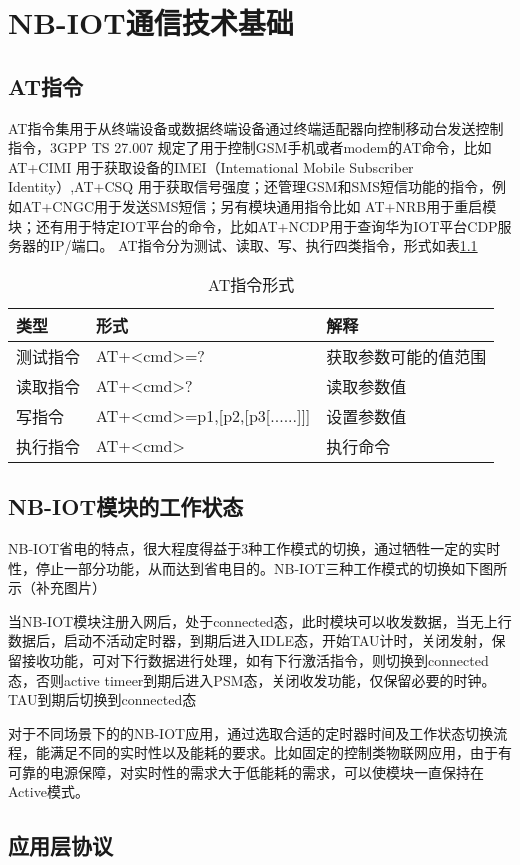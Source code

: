 \chapter{NB-IOT通信技术基础}


\section{AT指令}
AT指令集用于从终端设备或数据终端设备通过终端适配器向控制移动台发送控制指令，3GPP TS 27.007 规定了用于控制GSM手机或者modem的AT命令，比如 AT+CIMI 用于获取设备的IMEI（Intemational Mobile Subscriber Identity）,AT+CSQ 用于获取信号强度；还管理GSM和SMS短信功能的指令，例如AT+CNGC用于发送SMS短信；另有模块通用指令比如 AT+NRB用于重启模块；还有用于特定IOT平台的命令，比如AT+NCDP用于查询华为IOT平台CDP服务器的IP/端口。
AT指令分为测试、读取、写、执行四类指令，形式如表\ref{AT指令形式}

\begin{table}[h!]
\caption{AT指令形式}
\begin{tabular}{lll}
\toprule
类型&形式&解释\\
\midrule
测试指令&AT+<cmd>=?&获取参数可能的值范围\\
读取指令&AT+<cmd>?&读取参数值\\
写指令&AT+<cmd>=p1,[p2,[p3[......]]]&设置参数值\\
执行指令&AT+<cmd>&执行命令\\
\bottomrule
\end{tabular}
\label{AT指令形式}
\end{table}


\section{NB-IOT模块的工作状态}
NB-IOT省电的特点，很大程度得益于3种工作模式的切换，通过牺牲一定的实时性，停止一部分功能，从而达到省电目的。NB-IOT三种工作模式的切换如下图所示（补充图片）

当NB-IOT模块注册入网后，处于connected态，此时模块可以收发数据，当无上行数据后，启动不活动定时器，到期后进入IDLE态，开始TAU计时，关闭发射，保留接收功能，可对下行数据进行处理，如有下行激活指令，则切换到connected态，否则active timeer到期后进入PSM态，关闭收发功能，仅保留必要的时钟。TAU到期后切换到connected态

对于不同场景下的的NB-IOT应用，通过选取合适的定时器时间及工作状态切换流程，能满足不同的实时性以及能耗的要求。比如固定的控制类物联网应用，由于有可靠的电源保障，对实时性的需求大于低能耗的需求，可以使模块一直保持在Active模式。
\section{应用层协议}

